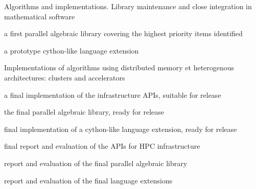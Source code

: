 \begin{workpackage}
\begin{wpdelivs}
  \begin{wpdeliv}[due=24,id=LinBox-algo,dissem=PU,nature=DEM]
    {Algorithms and implementations. Library maintenance and close integration
      in mathematical software}
  \end{wpdeliv}
  \begin{wpdeliv}[due=30,id=GAP-lib-impl,dissem=public,nature=software]
      {a first parallel algebraic library covering the
  highest priority items identified}
\end{wpdeliv}
  \begin{wpdeliv}[due=36,id=GAP-cython-proto,dissem=public,nature=software]
      {a prototype cython-like \GAP language extension}
\end{wpdeliv}
  \begin{wpdeliv}[due=36,id=LinBox-distributed,dissem=PU,nature=DEM]
    {Implementations of algorithms using distributed memory et heterogenous
      architectures: clusters and accelerators}
  \end{wpdeliv}
  \begin{wpdeliv}[due=47,id=GAP-APIs-final,dissem=public,nature=software]
      {a final implementation of the infrastructure APIs, suitable for release}
\end{wpdeliv}
  \begin{wpdeliv}[due=47,id=GAP-lib-final,dissem=public,nature=software]
      {the final parallel algebraic library, ready for release}
\end{wpdeliv}
  \begin{wpdeliv}[due=47,id=GAP-cython-final,dissem=public,nature=software]
      {final implementation of a cython-like \GAP language extension,
        ready for release}
\end{wpdeliv}
  \begin{wpdeliv}[due=48,id=GAP-APIs-report,dissem=public,nature=report]
      {final report and evaluation of the \GAP APIs for HPC infrastructure}
\end{wpdeliv}
  \begin{wpdeliv}[due=48,id=GAP-lib-report,dissem=public,nature=report]
      {report and evaluation of the final parallel algebraic library}
\end{wpdeliv}
  \begin{wpdeliv}[due=48,id=GAP-cython-report,dissem=public,nature=report]
      {report and evaluation of the final \GAP language extensions}
\end{wpdeliv}
\end{wpdelivs}
\end{workpackage}

